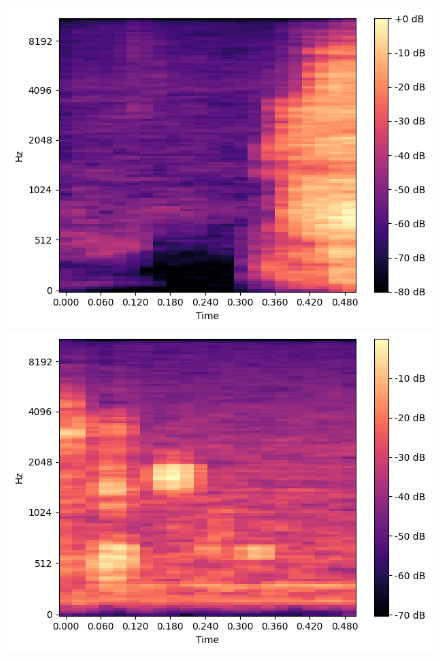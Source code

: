\begin{figure}[t]
\begin{minipage}[b]{0.16\hsize}
        \includegraphics[width=\hsize]{img/melspec/cookie.png}
    \end{minipage}
    \begin{minipage}[b]{0.16\hsize}
        \centering
        \includegraphics[width=\hsize]{img/melspec/potato-chips.png}
    \end{minipage}
    \begin{minipage}[b]{0.16\hsize}
        \centering

\end{minipage}
\end{figure}
